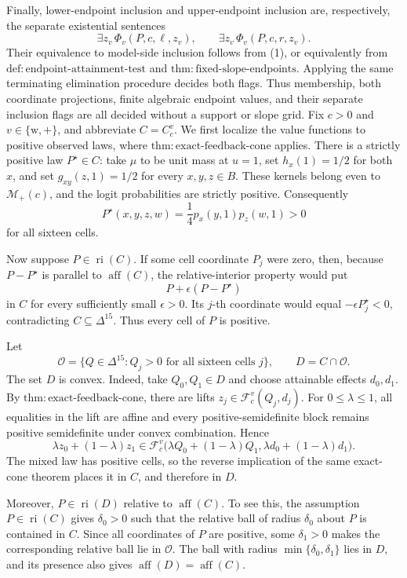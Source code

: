 Finally, lower-endpoint inclusion and upper-endpoint inclusion are, respectively, the separate existential sentences
\[
 \exists z_v\,\Phi_v(P,c,\ell,z_v),
 \qquad
 \exists z_v\,\Phi_v(P,c,r,z_v).
\]
Their equivalence to model-side inclusion follows from (1), or equivalently from \(\mathrm{def{:}endpoint\text{-}attainment\text{-}test}\) and \(\mathrm{thm{:}fixed\text{-}slope\text{-}endpoints}\).  Applying the same terminating elimination procedure decides both flags.  Thus membership, both coordinate projections, finite algebraic endpoint values, and their separate inclusion flags are all decided without a support or slope grid.
Fix \(c>0\) and \(v\in\{\mathrm w,+\}\), and abbreviate \(C=C_c^v\).  We first localize the value functions to positive observed laws, where \(\mathrm{thm{:}exact\text{-}feedback\text{-}cone}\) applies.  There is a strictly positive law \(P^\star\in C\): take \(\mu\) to be unit mass at \(u=1\), set \(h_x(1)=1/2\) for both \(x\), and set \(g_{xy}(z,1)=1/2\) for every \(x,y,z\in B\).  These kernels belong even to \(\mathcal M_+(c)\), and the logit probabilities are strictly positive.  Consequently
\[
 P^\star(x,y,z,w)=\frac14p_x(y,1)p_z(w,1)>0
\]
for all sixteen cells.

Now suppose \(P\in\operatorname{ri}(C)\).  If some cell coordinate \(P_j\) were zero, then, because \(P-P^\star\) is parallel to \(\operatorname{aff}(C)\), the relative-interior property would put
\[
 P+\epsilon(P-P^\star)
\]
in \(C\) for every sufficiently small \(\epsilon>0\).  Its \(j\)-th coordinate would equal \(-\epsilon P_j^\star<0\), contradicting \(C\subseteq\Delta^{15}\).  Thus every cell of \(P\) is positive.

Let
\[
 \mathcal O=\{Q\in\Delta^{15}:Q_j>0\text{ for all sixteen cells }j\},
 \qquad D=C\cap\mathcal O.
\]
The set \(D\) is convex.  Indeed, take \(Q_0,Q_1\in D\) and choose attainable effects \(d_0,d_1\).  By \(\mathrm{thm{:}exact\text{-}feedback\text{-}cone}\), there are lifts \(z_j\in\mathcal F_c^v(Q_j,d_j)\).  For \(0\le\lambda\le1\), all equalities in the lift are affine and every positive-semidefinite block remains positive semidefinite under convex combination.  Hence
\[
 \lambda z_0+(1-\lambda)z_1
 \in\mathcal F_c^v\bigl(\lambda Q_0+(1-\lambda)Q_1,
 \lambda d_0+(1-\lambda)d_1\bigr).
\]
The mixed law has positive cells, so the reverse implication of the same exact-cone theorem places it in \(C\), and therefore in \(D\).

Moreover, \(P\in\operatorname{ri}(D)\) relative to \(\operatorname{aff}(C)\).  To see this, the assumption \(P\in\operatorname{ri}(C)\) gives \(\delta_0>0\) such that the relative ball of radius \(\delta_0\) about \(P\) is contained in \(C\).  Since all coordinates of \(P\) are positive, some \(\delta_1>0\) makes the corresponding relative ball lie in \(\mathcal O\).  The ball with radius \(\min\{\delta_0,\delta_1\}\) lies in \(D\), and its presence also gives \(\operatorname{aff}(D)=\operatorname{aff}(C)\).

